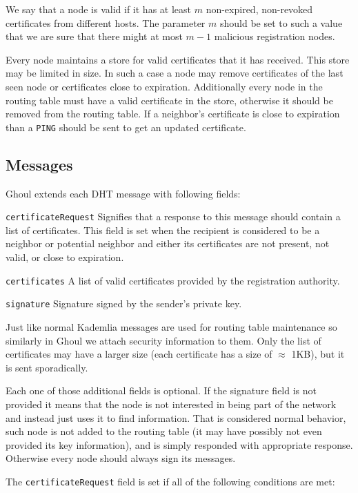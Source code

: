 We say that a node is valid if it has at least $m$ non-expired, non-revoked
certificates from different hosts. The parameter $m$ should be set to such a
value that we are sure that there might at most $m-1$ malicious registration
nodes.

Every node maintains a store for valid certificates that it has received. This
store may be limited in size. In such a case a node may remove certificates of
the last seen node or certificates close to expiration. Additionally every
node in the routing table must have a valid certificate in the store, otherwise
it should be removed from the routing table. If a neighbor's certificate is
close to expiration than a \texttt{PING} should be sent to get an updated
certificate.

\subsection{Messages}
Ghoul extends each DHT message with following fields:
\begin{description}
  \item{\texttt{certificateRequest}} Signifies that a response to this message
    should contain a list of certificates. This field is set when the recipient
    is considered to be a neighbor or potential neighbor and either its
    certificates are not present, not valid, or close to expiration.
  \item{\texttt{certificates}} A list of valid certificates provided by the
    registration authority.
  \item{\texttt{signature}} Signature signed by the sender's private key.
\end{description}

Just like normal Kademlia messages are used for routing table maintenance so
similarly in Ghoul we attach security information to them. Only the list of
certificates may have a larger size (each certificate has a size of $\approx$
1KB), but it is sent sporadically.

Each one of those additional fields is optional. If the signature field is not
provided it means that the node is not interested in being part of the network
and instead just uses it to find information. That is considered normal
behavior, such node is not added to the routing table (it may have possibly not
even provided its key information), and is simply responded with appropriate
response. Otherwise every node should always sign its messages.

The \texttt{certificateRequest} field is set if all of the following conditions
are met:

